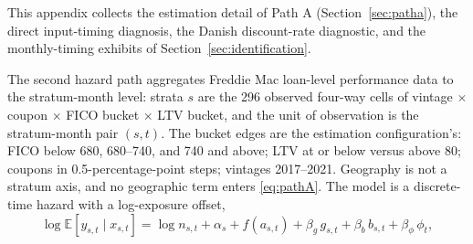 \documentclass[12pt]{article}
\begin{document}
This appendix collects the estimation detail of Path A (Section~\ref{sec:patha}), the direct input-timing diagnosis, the Danish discount-rate diagnostic, and the monthly-timing exhibits of Section~\ref{sec:identification}.

The second hazard path aggregates Freddie Mac loan-level performance data to the stratum-month level: strata $s$ are the 296 observed four-way cells of vintage $\times$ coupon $\times$ FICO bucket $\times$ LTV bucket, and the unit of observation is the stratum-month pair $(s,t)$. The bucket edges are the estimation configuration's: FICO below 680, 680--740, and 740 and above; LTV at or below versus above 80; coupons in 0.5-percentage-point steps; vintages 2017--2021. Geography is not a stratum axis, and no geographic term enters \eqref{eq:pathA}. The model is a discrete-time hazard with a log-exposure offset,
\begin{equation}\label{eq:pathA}
\log \mathbb{E}\!\left[y_{s,t} \mid x_{s,t}\right] = \log n_{s,t} + \alpha_{s} + f\!\left(a_{s,t}\right) + \beta_g\, g_{s,t} + \beta_b\, b_{s,t} + \beta_\phi\, \phi_t ,
\end{equation}
\end{document}
